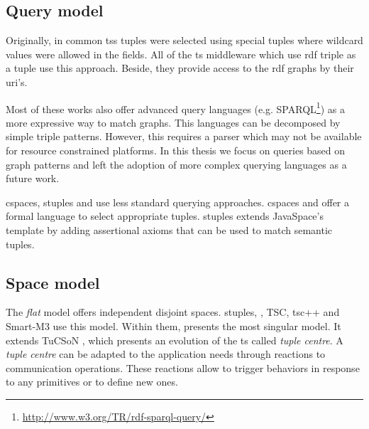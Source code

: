 


\subsection{Query model}

Originally, in common \ac{ts}s tuples were selected using special tuples where wildcard values were allowed in the fields.
All of the \ac{ts} middleware which use \ac{rdf} triple as a tuple use this approach.
Beside, they provide access to the \ac{rdf} graphs by their \ac{uri}'s.

Most of these works also offer advanced query languages (e.g. SPARQL\footnote{\url{http://www.w3.org/TR/rdf-sparql-query/}}) as a more expressive way to match graphs.
This languages can be decomposed by simple triple patterns.
However, this requires a parser which may not be available for resource constrained platforms.
In this thesis we focus on queries based on graph patterns and left the adoption of more complex querying languages as a future work.

\ac{cspaces}, \ac{stuples} and \citeauthor{nardini_semantic_2013} use less standard querying approaches.
\ac{cspaces} \citep{martinrecuerda_towards_2005} and \citet{nardini_semantic_2013} offer a formal language to select appropriate tuples.
\ac{stuples}\citep{khushraj_stuples:_2004} extends JavaSpace's template by adding assertional axioms that can be used to match semantic tuples.


\subsection{Space model}

The \emph{flat} model offers independent disjoint spaces.
\ac{stuples}, \citet{nardini_semantic_2013}, TSC, tsc++ and Smart-M3 use this model.
Within them, \citet{nardini_semantic_2013} presents the most singular model.
It extends TuCSoN \cite{omicini_tucson:_1998}, which presents an evolution of the \ac{ts} called \emph{tuple centre}.
A \emph{tuple centre} can be adapted to the application needs through reactions to communication operations.
These reactions allow to trigger behaviors in response to any primitives or to define new ones.



